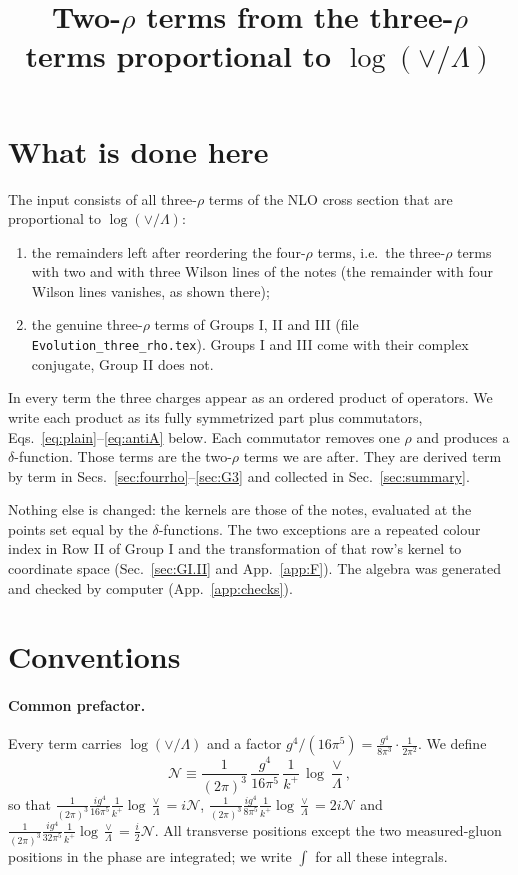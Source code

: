 \documentclass[10pt]{article}
\title{Two-$\rho$ terms from the three-$\rho$ terms proportional to $\log(\vee/\Lambda)$}
\date{}
\numberwithin{equation}{section}
\newcommand{\NN}{\mathcal N}
\begin{document}
\maketitle
\tableofcontents

\section{What is done here}\label{sec:intro}

The input consists of all three-$\rho$ terms of the NLO cross section that are proportional to $\log(\vee/\Lambda)$:
\begin{enumerate}
\item the remainders left after reordering the four-$\rho$ terms, i.e.\ the three-$\rho$ terms with two and with three Wilson lines of the notes (the remainder with four Wilson lines vanishes, as shown there);
\item the genuine three-$\rho$ terms of Groups I, II and III (file \texttt{Evolution\_three\_rho.tex}). Groups I and III come with their complex conjugate, Group II does not.
\end{enumerate}
In every term the three charges appear as an ordered product of operators. We write each product as its fully symmetrized part plus commutators, Eqs.~\eqref{eq:plain}--\eqref{eq:antiA} below. Each commutator removes one $\rho$ and produces a $\delta$-function. Those terms are the two-$\rho$ terms we are after. They are derived term by term in Secs.~\ref{sec:fourrho}--\ref{sec:G3} and collected in Sec.~\ref{sec:summary}.

Nothing else is changed: the kernels are those of the notes, evaluated at the points set equal by the $\delta$-functions. The two exceptions are a repeated colour index in Row II of Group I and the transformation of that row's kernel to coordinate space (Sec.~\ref{sec:GI.II} and App.~\ref{app:F}). The algebra was generated and checked by computer (App.~\ref{app:checks}).

\section{Conventions}\label{sec:conv}

\paragraph{Common prefactor.} Every term carries $\log(\vee/\Lambda)$ and a factor $g^4/(16\pi^5)=\frac{g^4}{8\pi^3}\cdot\frac{1}{2\pi^2}$. We define
\begin{equation}
\NN\equiv\frac{1}{(2\pi)^3}\,\frac{g^4}{16\pi^5}\,\frac{1}{k^+}\,\log\frac{\vee}{\Lambda},
\label{eq:NN}
\end{equation}
so that $\frac{1}{(2\pi)^3}\frac{ig^4}{16\pi^5}\frac{1}{k^+}\log\frac\vee\Lambda=i\NN$, $\frac{1}{(2\pi)^3}\frac{ig^4}{8\pi^5}\frac{1}{k^+}\log\frac\vee\Lambda=2i\NN$ and $\frac{1}{(2\pi)^3}\frac{ig^4}{32\pi^5}\frac{1}{k^+}\log\frac\vee\Lambda=\frac i2\NN$. All transverse positions except the two measured-gluon positions in the phase are integrated; we write $\int$ for all these integrals.
\end{document}
